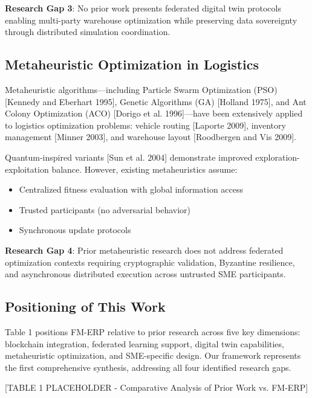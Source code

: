 \documentclass[times,10pt,twocolumn]{jucs2e}
\begin{document}
\textbf{Research Gap 3}: No prior work presents federated digital twin protocols enabling multi-party warehouse optimization while preserving data sovereignty through distributed simulation coordination.

\subsection{Metaheuristic Optimization in Logistics}

Metaheuristic algorithms—including Particle Swarm Optimization (PSO) [Kennedy and Eberhart 1995], Genetic Algorithms (GA) [Holland 1975], and Ant Colony Optimization (ACO) [Dorigo et al. 1996]—have been extensively applied to logistics optimization problems: vehicle routing [Laporte 2009], inventory management [Minner 2003], and warehouse layout [Roodbergen and Vis 2009].

Quantum-inspired variants [Sun et al. 2004] demonstrate improved exploration-exploitation balance. However, existing metaheuristics assume:
\begin{itemize}
\item Centralized fitness evaluation with global information access
\item Trusted participants (no adversarial behavior)
\item Synchronous update protocols
\end{itemize}

\textbf{Research Gap 4}: Prior metaheuristic research does not address federated optimization contexts requiring cryptographic validation, Byzantine resilience, and asynchronous distributed execution across untrusted SME participants.

\subsection{Positioning of This Work}

Table 1 positions FM-ERP relative to prior research across five key dimensions: blockchain integration, federated learning support, digital twin capabilities, metaheuristic optimization, and SME-specific design. Our framework represents the first comprehensive synthesis, addressing all four identified research gaps.

[TABLE 1 PLACEHOLDER - Comparative Analysis of Prior Work vs. FM-ERP]

\end{document}
